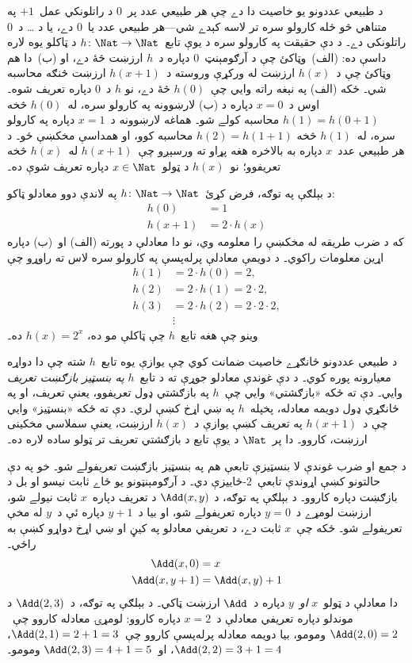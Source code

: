 \documentclass[../../../include/open-logic-section]{subfiles}
\begin{document}

د طبيعي عددونو يو خاصيت دا دے چې هر طبيعي عدد پر~$0$ د راتلونکي
عمل~$+1$ په متناهي څو ځله کارولو سره تر لاسه کېدے شي---هر طبيعي عدد
يا~$0$ دے، يا د \dots{} د~$0$ راتلونکی دے۔ د دې حقيقت په کارولو سره
د يوې تابع~$h\colon\Nat \to \Nat$ د ټاکلو يوه لاره داسې ده:
(الف)~وټاکئ چې د آرګومېنټ~$0$ دپاره د~$h$ ارزښت څۀ دے، او
(ب)~دا هم وټاکئ چې د~$h(x)$ ارزښت له ورکړې وروسته د~$h(x+1)$ ارزښت
څنګه محاسبه شي۔ ځکه (الف) په نېغه راته وايي چې~$h(0)$ څۀ دے، نو
$h$ د~$0$ دپاره تعريف شوه۔ اوس د~$x=0$ دپاره د (ب) لارښوونه په
کارولو سره، له~$h(0)$ څخه $h(1) = h(0+1)$ محاسبه کولے شو۔ هماغه
لارښوونه د~$x=1$ دپاره په کارولو سره، له~$h(1)$ څخه
$h(2) = h(1+1)$ محاسبه کوو، او همداسې مخکښې ځو۔ د هر طبيعي
عدد~$x$ دپاره به بالاخره هغه پړاو ته ورسېږو چې~$h(x+1)$ له~$h(x)$
څخه تعريفوو؛ نو~$h(x)$ د ټولو~$x \in \Nat$ دپاره تعريف شوې ده۔

د بېلګې په توګه، فرض کړئ~$h\colon \Nat \to \Nat$ په لاندې دوو
معادلو ټاکو:
\begin{align*}
h(0) & =  1\\
h(x+1) & =  2 \cdot h(x)
\end{align*}
که د ضرب طريقه له مخکښې را معلومه وي، نو دا معادلې د پورته (الف)
او~(ب) دپاره اړين معلومات راکوي۔ د دويمې معادلې پرله‌پسې په کارولو
سره لاس ته راوړو چې
\begin{align*}
  h(1) & = 2\cdot h(0) = 2,\\
  h(2) & = 2\cdot h(1) = 2\cdot 2,\\
  h(3) & = 2 \cdot h(2) = 2\cdot 2 \cdot 2,\\
  & \vdots
\end{align*}
وينو چې هغه تابع~$h$ چې ټاکلې مو ده، $h(x) = 2^x$ ده۔

د طبيعي عددونو ځانګړے خاصيت ضمانت کوي چې يوازې يوه تابع~$h$ شته
چې دا دواړه معيارونه پوره کوي۔ د دې غوندې معادلو جوړې ته د
تابع~$h$ \emph{په بنسټيز بازګښت تعريف} وايي۔ دې ته ځکه
«بازګشتي» وايي چې~$h$ په بازګشتي ډول تعريفوو، يعنې تعريف، او په
ځانګړي ډول دويمه معادله، پخپله~$h$
په ښي اړخ کښې لري۔ دې ته ځکه «بنسټيز» وايي چې د~$h(x+1)$ په تعريف
کښې يوازې د~$h(x)$ ارزښت، يعنې سملاسي مخکينی ارزښت، کاروو۔ دا
پر~$\Nat$ د يوې تابع د بازګشتي تعريف تر ټولو ساده لاره ده۔

د جمع او ضرب غوندې لا بنسټيزې تابعې هم په بنسټيز بازګښت تعريفولے
شو۔ خو په دې حالتونو کښې اړوندې تابعې~$2$-ځاييزې دي۔ د آرګومېنټونو
يو ځاے ثابت نيسو او بل د بازګښت دپاره کاروو۔ د بېلګې په توګه، د
$\Add(x, y)$ د تعريف دپاره~$x$ ثابت نيولے شو، ارزښت لومړے د~$y=0$
دپاره تعريفولے شو، او بيا د~$y+1$ دپاره ئې د~$y$ له مخې تعريفولے
شو۔ ځکه چې~$x$ ثابت دے، د تعريفي معادلو په کيڼ او ښي اړخ دواړو
کښې به راځي۔
\begin{align*}
\Add(x,0) & =  x\\
\Add(x,y+1) & =  \Add(x,y)+1
\end{align*}
دا معادلې د ټولو~$x$ \emph{او}~$y$ دپاره د~$\Add$ ارزښت ټاکي۔ د
بېلګې په توګه، د~$\Add(2,3)$ د موندلو دپاره تعريفي معادلې د~$x = 2$
دپاره کاروو: لومړۍ معادله کاروو چې~$\Add(2,0) = 2$ ومومو، بيا
دويمه معادله پرله‌پسې کاروو چې~$\Add(2,1) = 2 + 1 = 3$،
$\Add(2, 2) = 3 + 1 = 4$، او~$\Add(2, 3) = 4 + 1 = 5$ ومومو۔
\end{document}
